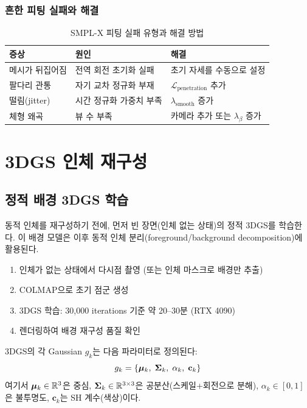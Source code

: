 \documentclass[11pt, a4paper]{report}
\begin{document}
\subsection{흔한 피팅 실패와 해결}

\begin{table}[H]
\centering
\caption{SMPL-X 피팅 실패 유형과 해결 방법}
\begin{tabularx}{\textwidth}{lXX}
\toprule
\textbf{증상} & \textbf{원인} & \textbf{해결} \\
\midrule
메시가 뒤집어짐 & 전역 회전 초기화 실패 & 초기 자세를 수동으로 설정 \\
팔다리 관통 & 자기 교차 정규화 부재 & $\mathcal{L}_{\text{penetration}}$ 추가 \\
떨림(jitter) & 시간 정규화 가중치 부족 & $\lambda_{\text{smooth}}$ 증가 \\
체형 왜곡 & 뷰 수 부족 & 카메라 추가 또는 $\lambda_\beta$ 증가 \\
\bottomrule
\end{tabularx}
\end{table}


\chapter{3DGS 인체 재구성}

\section{정적 배경 3DGS 학습}

동적 인체를 재구성하기 전에, 먼저 빈 장면(인체 없는 상태)의 정적 3DGS를 학습한다.
이 배경 모델은 이후 동적 인체 분리(foreground/background decomposition)에 활용된다.

\begin{pipelinebox}[title={배경 3DGS 학습 단계}]
\begin{enumerate}[nosep]
  \item 인체가 없는 상태에서 다시점 촬영 (또는 인체 마스크로 배경만 추출)
  \item COLMAP으로 초기 점군 생성
  \item 3DGS 학습: 30,000 iterations 기준 약 20--30분 (RTX 4090)
  \item 렌더링하여 배경 재구성 품질 확인
\end{enumerate}
\end{pipelinebox}

3DGS의 각 Gaussian $g_k$는 다음 파라미터로 정의된다:
\begin{equation}
  g_k = \left\{ \bm{\mu}_k,\; \bm{\Sigma}_k,\; \alpha_k,\; \mathbf{c}_k \right\}
\end{equation}
여기서 $\bm{\mu}_k \in \mathbb{R}^3$은 중심, $\bm{\Sigma}_k \in \mathbb{R}^{3\times3}$은 공분산(스케일+회전으로 분해),
$\alpha_k \in [0,1]$은 불투명도, $\mathbf{c}_k$는 SH 계수(색상)이다.
\end{document}
